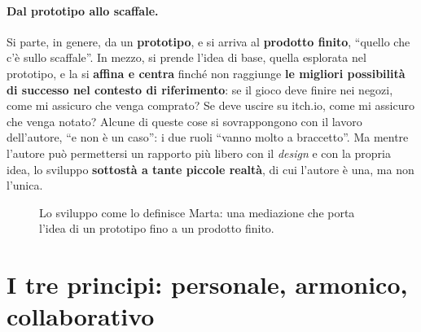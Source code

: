 \paragraph{Dal prototipo allo scaffale.} Si parte, in genere, da un \textbf{prototipo}, e
si arriva al \textbf{prodotto finito}, ``quello che c'è sullo scaffale''. In mezzo, si
prende l'idea di base, quella esplorata nel prototipo, e la si \textbf{affina e centra}
finché non raggiunge \textbf{le migliori possibilità di successo nel contesto di
riferimento}: se il gioco deve finire nei negozi, come mi assicuro che venga comprato? Se
deve uscire su itch.io, come mi assicuro che venga notato? Alcune di queste cose si
sovrappongono con il lavoro dell'autore, ``e non è un caso'': i due ruoli ``vanno molto a
braccetto''. Ma mentre l'autore può permettersi un rapporto più libero con il
\emph{design} e con la propria idea, lo sviluppo \textbf{sottostà a tante piccole
realtà}, di cui l'autore è una, ma non l'unica.

\begin{figure}[htbp]
\centering
{}
\caption{Lo sviluppo come lo definisce Marta: una mediazione che porta l'idea di un
prototipo fino a un prodotto finito.}
\label{a13:fig:percorso}
\end{figure}

\section{I tre principi: personale, armonico, collaborativo}
\label{a13:sec:principi}

